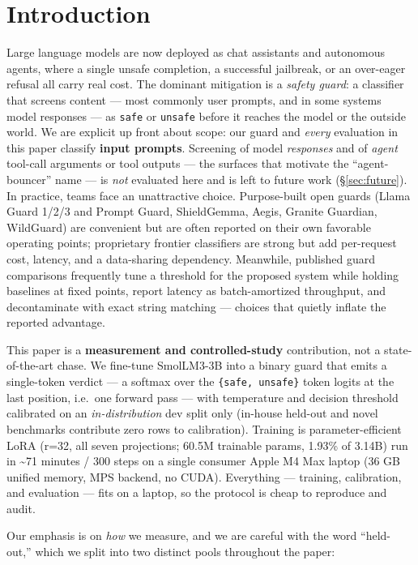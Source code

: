 \documentclass[sigconf,nonacm]{acmart}
\begin{document}
\section{Introduction}

Large language models are now deployed as chat assistants and autonomous agents, where a single unsafe completion, a successful jailbreak, or an over-eager refusal all carry real cost. The dominant mitigation is a \emph{safety guard}: a classifier that screens content --- most commonly user prompts, and in some systems model responses --- as \texttt{safe} or \texttt{unsafe} before it reaches the model or the outside world. We are explicit up front about scope: our guard and \emph{every} evaluation in this paper classify \textbf{input prompts}. Screening of model \emph{responses} and of \emph{agent} tool-call arguments or tool outputs --- the surfaces that motivate the ``agent-bouncer'' name --- is \emph{not} evaluated here and is left to future work (\S\ref{sec:future}). In practice, teams face an unattractive choice. Purpose-built open guards (Llama Guard 1/2/3 and Prompt Guard, ShieldGemma, Aegis, Granite Guardian, WildGuard) are convenient but are often reported on their own favorable operating points; proprietary frontier classifiers are strong but add per-request cost, latency, and a data-sharing dependency. Meanwhile, published guard comparisons frequently tune a threshold for the proposed system while holding baselines at fixed points, report latency as batch-amortized throughput, and decontaminate with exact string matching --- choices that quietly inflate the reported advantage.

This paper is a \textbf{measurement and controlled-study} contribution, not a state-of-the-art chase. We fine-tune SmolLM3-3B into a binary guard that emits a single-token verdict --- a softmax over the \texttt{\{safe, unsafe\}} token logits at the last position, i.e.\ one forward pass --- with temperature and decision threshold calibrated on an \emph{in-distribution} dev split only (in-house held-out and novel benchmarks contribute zero rows to calibration). Training is parameter-efficient LoRA (r=32, all seven projections; 60.5M trainable params, 1.93\% of 3.14B) run in \textasciitilde{}71 minutes / 300 steps on a single consumer Apple M4 Max laptop (36 GB unified memory, MPS backend, no CUDA). Everything --- training, calibration, and evaluation --- fits on a laptop, so the protocol is cheap to reproduce and audit.

Our emphasis is on \emph{how} we measure, and we are careful with the word ``held-out,'' which we split into two distinct pools throughout the paper:
\end{document}
